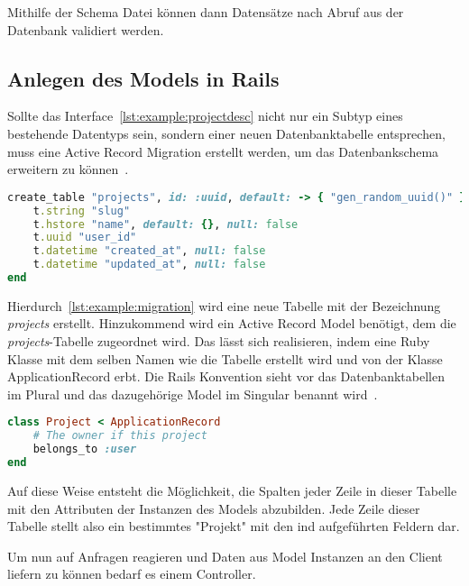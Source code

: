 Mithilfe der Schema Datei können dann Datensätze nach Abruf aus der Datenbank validiert werden.

\subsection{Anlegen des Models in Rails}
\label{sec:requirements:example:model}

Sollte das Interface~\ref{lst:example:projectdesc} nicht nur ein Subtyp eines bestehende Datentyps sein,
sondern einer neuen Datenbanktabelle entsprechen, muss eine Active Record Migration erstellt werden,
um das Datenbankschema erweitern zu können~\cite{rails-migration}.

\begin{lstlisting}[language=Ruby,float=h!,caption={Rails Migration zum hinzufügen einer \emph{projects} Datenbanktabelle}, label={lst:example:migration}]
create_table "projects", id: :uuid, default: -> { "gen_random_uuid()" }, force: :cascade do |t|
    t.string "slug"
    t.hstore "name", default: {}, null: false
    t.uuid "user_id"
    t.datetime "created_at", null: false
    t.datetime "updated_at", null: false
end
\end{lstlisting}

Hierdurch~\ref{lst:example:migration} wird eine neue Tabelle mit der Bezeichnung \emph{projects} erstellt.
Hinzukommend wird ein Active Record Model benötigt, dem die \emph{projects}-Tabelle zugeordnet wird.
Das lässt sich realisieren, indem eine Ruby Klasse mit dem selben Namen wie die Tabelle erstellt wird und
von der Klasse ApplicationRecord erbt.
Die Rails Konvention sieht vor das Datenbanktabellen im Plural und das dazugehörige Model im Singular benannt wird~\cite{rails-naming-convention}.

\begin{lstlisting}[language=Ruby,float=h!,caption={Model}, label={lst:example:model}]
class Project < ApplicationRecord
    # The owner if this project
    belongs_to :user
end
\end{lstlisting}

Auf diese Weise entsteht die Möglichkeit, die Spalten jeder Zeile in dieser Tabelle mit den Attributen der Instanzen des Models abzubilden.
Jede Zeile dieser Tabelle stellt also ein bestimmtes "Projekt" mit den ind  aufgeführten Feldern dar.

Um nun auf Anfragen reagieren und Daten aus Model Instanzen an den Client liefern zu können bedarf es einem Controller.

